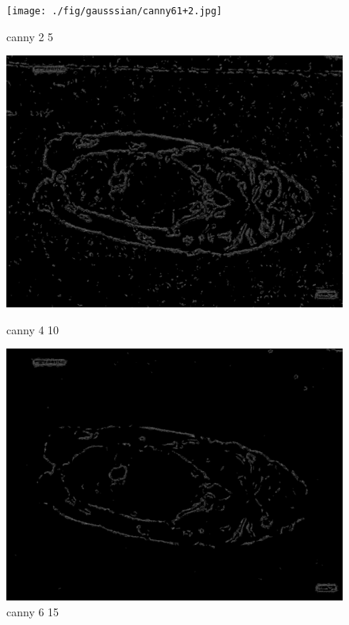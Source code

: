 \begin{figure}
    \centering
    \begin{minipage}{0.32\textwidth}
        \centering
        \texttt{[image: ./fig/gausssian/canny61+2.jpg]}
        \caption{canny 2 5}
        \label{fig:canny2_5}
    \end{minipage}
    \begin{minipage}{0.32\textwidth}
        \centering
        \includegraphics[width=\textwidth]{./fig/gausssian/canny61+4.jpg}
        \caption{canny 4 10}
        \label{fig:canny4_10}
    \end{minipage}
    \begin{minipage}{0.32\textwidth}
        \centering
        \includegraphics[width=\textwidth]{./fig/gausssian/canny61+6.jpg}
        \caption{canny 6 15}
        \label{fig:canny6_15}
    \end{minipage}
\end{figure}

